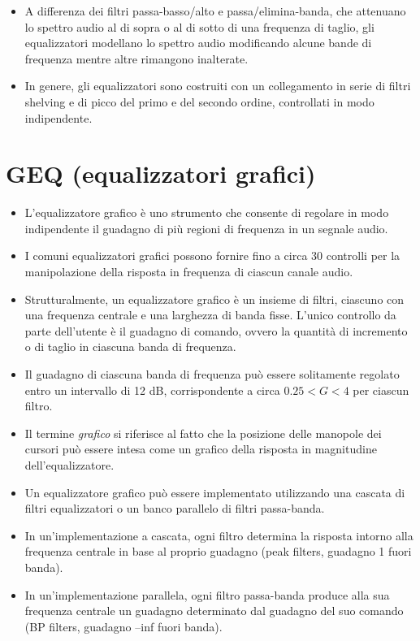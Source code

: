 \begin{itemize}
    \item A differenza dei filtri passa-basso/alto e passa/elimina-banda, che attenuano lo spettro audio al di sopra o al di sotto di una frequenza di taglio, gli equalizzatori modellano lo spettro audio modificando alcune bande di frequenza mentre altre rimangono inalterate.
    
    \item In genere, gli equalizzatori sono costruiti con un collegamento in serie di filtri shelving e di picco del primo e del secondo ordine, controllati in modo indipendente.
\end{itemize}

\section{GEQ (equalizzatori grafici)}

\begin{itemize}
    \item L'equalizzatore grafico è uno strumento che consente di regolare in modo indipendente il guadagno di più regioni di frequenza in un segnale audio.
    
    \item I comuni equalizzatori grafici possono fornire fino a circa 30 controlli per la manipolazione della risposta in frequenza di ciascun canale audio.
    
    \item Strutturalmente, un equalizzatore grafico è un insieme di filtri, ciascuno con una frequenza centrale e una larghezza di banda fisse. L'unico controllo da parte dell'utente è il guadagno di comando, ovvero la quantità di incremento o di taglio in ciascuna banda di frequenza.
\end{itemize}

\bigskip

\begin{itemize}
    \item Il guadagno di ciascuna banda di frequenza può essere solitamente regolato entro un intervallo di 12 dB, corrispondente a circa $0.25 < G < 4$ per ciascun filtro.
    
    \item Il termine \textit{grafico} si riferisce al fatto che la posizione delle manopole dei cursori può essere intesa come un grafico della risposta in magnitudine dell'equalizzatore.
    
    \item Un equalizzatore grafico può essere implementato utilizzando una cascata di filtri equalizzatori o un banco parallelo di filtri passa-banda.
    
    \item In un'implementazione a cascata, ogni filtro determina la risposta intorno alla frequenza centrale in base al proprio guadagno (peak filters, guadagno 1 fuori banda).
    
    \item In un'implementazione parallela, ogni filtro passa-banda produce alla sua frequenza centrale un guadagno determinato dal guadagno del suo comando (BP filters, guadagno –inf fuori banda).
\end{itemize}
